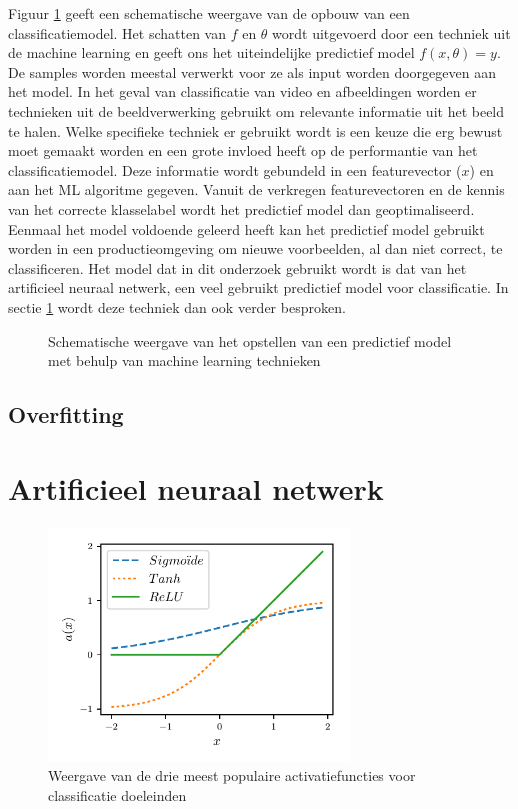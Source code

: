\npar Figuur \ref{alg-class-model} geeft een schematische weergave van de opbouw van een classificatiemodel. Het schatten van $f$ en $\theta$ wordt uitgevoerd door een techniek uit de machine learning en geeft ons het uiteindelijke predictief model $f(x,\theta) = y$. De samples worden meestal verwerkt voor ze als input worden doorgegeven aan het model. In het geval van classificatie van video en afbeeldingen worden er technieken uit de beeldverwerking gebruikt om relevante informatie uit het beeld te halen. Welke specifieke techniek er gebruikt wordt is een keuze die erg bewust moet gemaakt worden en een grote invloed heeft op de performantie van het classificatiemodel. Deze informatie wordt gebundeld in een featurevector ($x$) en aan het ML algoritme gegeven. Vanuit de verkregen featurevectoren en de kennis van het correcte klasselabel wordt het predictief model dan geoptimaliseerd.
\npar Eenmaal het model voldoende geleerd heeft kan het predictief model gebruikt worden in een productieomgeving om nieuwe voorbeelden, al dan niet correct, te classificeren.
\npar Het model dat in dit onderzoek gebruikt wordt is dat van het artificieel neuraal netwerk, een veel gebruikt predictief model voor classificatie. In sectie \ref{sec:ann} wordt deze techniek dan ook verder besproken.
\begin{figure}
	\centering
	\def\svgscale{0.85}
	
	\singlespace \caption{Schematische weergave van het opstellen van een predictief model met behulp van machine learning technieken \label{alg-class-model}}
\end{figure}

\subsection{Overfitting}


\cite{dropout}

\section{Artificieel neuraal netwerk}\label{sec:ann}

\begin{figure}[ht]
	\begin{center}
		\includegraphics[width=8cm,keepaspectratio]{figuren/activatiefuncties.pdf}
		\singlespacing\caption{Weergave van de drie meest populaire activatiefuncties voor classificatie doeleinden \label{class-functies}}
	\end{center}
\end{figure}

